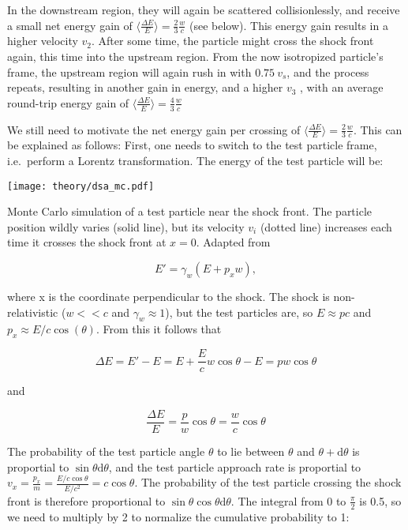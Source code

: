 In the downstream region, they will again be scattered collisionlessly, and receive a small net energy gain of $\big\langle\frac{\Delta E}{E}\big\rangle = \frac{2}{3}\frac{w}{c}$ (see below). This energy gain results in a higher velocity $v_2$. After some time, the particle might cross the shock front again, this time into the upstream region. From the now isotropized particle's frame, the upstream region will again rush in with $0.75~v_s$, and the process repeats, resulting in another gain in energy, and a higher $v_3$ , with an average round-trip energy gain of $\big\langle\frac{\Delta E}{E}\big\rangle = \frac{4}{3}\frac{w}{c}$

We still need to motivate the net energy gain per crossing of $\big\langle\frac{\Delta E}{E}\big\rangle = \frac{2}{3}\frac{w}{c}$. This can be explained as follows: First, one needs to switch to the test particle frame, i.e.\ perform a Lorentz transformation. The energy of the test particle will be:

\begin{marginfigure}
    \texttt{[image: theory/dsa\_mc.pdf]}
    \caption[DSA Monte Carlo]{Monte Carlo simulation of a test particle near the shock front. The particle position wildly varies (solid line), but its velocity $v_i$ (dotted line) increases each time it crosses the shock front at $x=0$. Adapted from~\cite{Baring1997}}
\end{marginfigure}

\begin{equation}
    E' = \gamma_{w}(E+p_x w),
\end{equation}

where x is the coordinate perpendicular to the shock. The shock is non-relativistic ($w<<c$ and $\gamma_w\approx1$), but the test particles are, so $E\approx pc$ and $p_x \approx E/c \cos(\theta)$. From this it follows that

\begin{equation}
    \Delta E = E' - E = E+\frac{E}{c}w\cos{\theta}-E = pw\cos{\theta}
\end{equation}

and

\begin{equation}
    \frac{\Delta E}{E} = \frac{p}{w}\cos{\theta} = \frac{w}{c}\cos{\theta}
    \label{eqn:delta_e_over_e}
\end{equation}

The probability of the test particle angle $\theta$ to lie between $\theta$ and $\theta + \text{d}\theta$ is proportial to $\sin{\theta}\text{d}\theta$, and the test particle approach rate is proportial to $v_x = \frac{p_x}{m} = \frac{E/c\cos{\theta}}{E/c^2} = c \cos{\theta}$. The probability of the test particle crossing the shock front is therefore proportional to $\sin{\theta} \cos{\theta} \text{d}\theta$. The integral from 0 to $\frac{\pi}{2}$ is 0.5, so we need to multiply by 2 to normalize the cumulative probability to 1:

